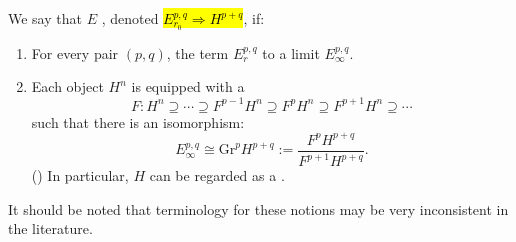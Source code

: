 \begin{definition}
\begin{enumerate}
        We say that $E$ , denoted \hl{$E_{r_0}^{p,q} \Rightarrow H^{p+q}$}, if:
        \begin{enumerate}
            \item For every pair $(p,q)$, the term $E_r^{p,q}$  to a limit $E_\infty^{p,q}$.
            \item Each object $H^n$ is equipped with a  
            $$F: H^n \supseteq \cdots \supseteq F^{p-1} H^n \supseteq F^p H^n \supseteq F^{p+1} H^n \supseteq \cdots$$
            such that there is an isomorphism:
            $$E_\infty^{p,q} \cong \text{Gr}^p H^{p+q} := \frac{F^p H^{p+q}}{F^{p+1} H^{p+q}}.$$
            ()
            In particular, $H$ can be regarded as a .
        \end{enumerate}

    \end{enumerate}

    It should be noted that terminology for these notions may be very inconsistent in the literature.
\end{definition}
